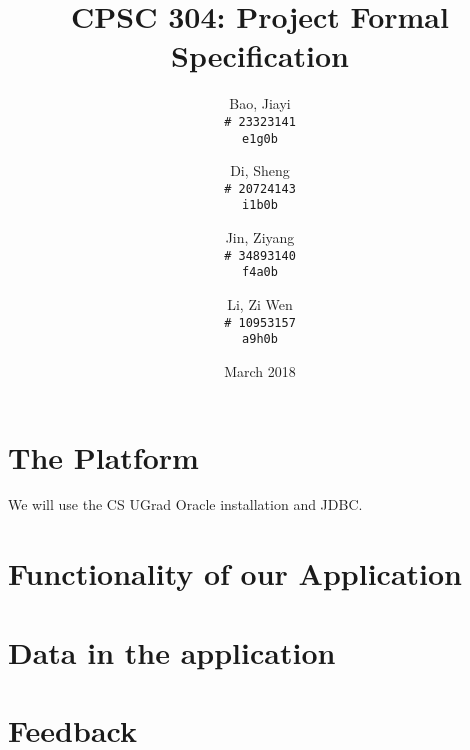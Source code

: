 \documentclass{article}
\title{CPSC 304: Project Formal Specification}
\author{
        Bao, Jiayi\\
        \texttt{\# 23323141}\\
        \texttt{e1g0b}\\
        \and
        Di, Sheng\\
        \texttt{\# 20724143}\\
        \texttt{i1b0b}\\
        \and
	Jin, Ziyang\\
	\texttt{\# 34893140}\\
	\texttt{f4a0b}
	\and
	Li, Zi Wen\\
	\texttt{\# 10953157}\\
	\texttt{a9h0b}
}
\date{March 2018}
\begin{document}
	\maketitle

\section{The Platform}

We will use the CS UGrad Oracle installation and JDBC.

\section{Functionality of our Application}



\section{Data in the application}


\section{Feedback}
\end{document}
